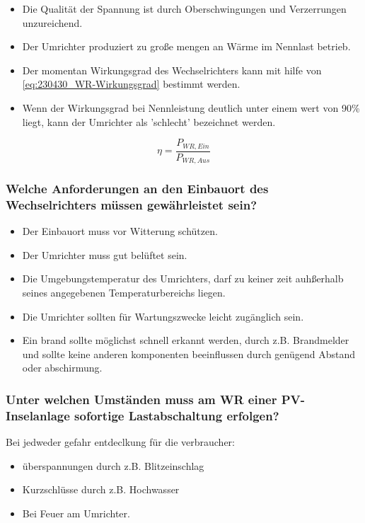 \begin{itemize}
    \item Die Qualität der Spannung ist durch Oberschwingungen und Verzerrungen unzureichend.
    \item Der Umrichter produziert zu große mengen an Wärme im Nennlast betrieb.
    \item Der momentan Wirkungsgrad des Wechselrichters kann mit hilfe von \autoref{eq:230430_WR-Wirkungsgrad} bestimmt werden.
    \item Wenn der Wirkungsgrad bei Nennleistung deutlich unter einem wert von 90\% liegt, kann der Umrichter als 'schlecht' bezeichnet werden.
\end{itemize}

\begin{equation}
    \eta = \frac{P_{WR,Ein}}{P_{WR,Aus}}
    \label{eq:230430_WR-Wirkungsgrad}
\end{equation}

\subsubsection{Welche Anforderungen an den Einbauort des Wechselrichters müssen gewährleistet sein?}
\begin{itemize}
    \item Der Einbauort muss vor Witterung schützen.
    \item Der Umrichter muss gut belüftet sein.
    \item Die Umgebungstemperatur des Umrichters, darf zu keiner zeit auhßerhalb seines angegebenen Temperaturbereichs liegen.
    \item Die Umrichter sollten für Wartungszwecke leicht zugänglich sein.
    \item Ein brand sollte möglichst schnell erkannt werden, durch z.B. Brandmelder und sollte keine anderen komponenten beeinflussen durch genügend Abstand oder abschirmung.
\end{itemize}
\subsubsection{Unter welchen Umständen muss am WR einer PV-Inselanlage sofortige Lastabschaltung erfolgen?}
Bei jedweder gefahr entdeclkung für die verbraucher:
\begin{itemize}
    \item überspannungen durch z.B. Blitzeinschlag
    \item Kurzschlüsse durch z.B. Hochwasser
    \item Bei Feuer am Umrichter.
\end{itemize}

